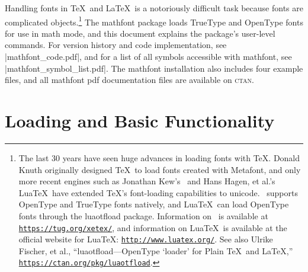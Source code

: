 \documentclass[12pt,twoside]{article}
\def\link#1{\href{#1}{\nolinkurl{#1}}}
\begin{document}
\def\ref#1{\csname fig@#1\endcsname}

\def\documentname{User Guide}
\def\showabstract{1}


Handling fonts in \TeX\ and \LaTeX\ is a notoriously difficult task because fonts are complicated objects.\footnote{The last 30 years have seen huge advances in loading fonts with \TeX. Donald Knuth originally designed \TeX\ to load fonts created with Metafont, and only more recent engines such as Jonathan Kew's \XeTeX\ and Hans Hagen, et al.'s Lua\TeX\ have extended \TeX's font-loading capabilities to unicode. \XeTeX\ supports OpenType and TrueType fonts natively, and Lua\TeX\ can load OpenType fonts through the \textsf{luaotfload} package. Information on \XeTeX\ is available at \link{https://tug.org/xetex/}, and information on Lua\TeX\ is available at the official website for Lua\TeX: \link{http://www.luatex.org/}. See also Ulrike Fischer, et al., ``\textsf{luaotfload}---OpenType `loader' for Plain \TeX\ and \LaTeX,'' \link{https://ctan.org/pkg/luaotfload}.} The \textsf{mathfont} package loads TrueType and OpenType fonts for use in math mode, and this document explains the package's user-level commands. For version history and code implementation, see |mathfont_code.pdf|, and for a list of all symbols accessible with \textsf{mathfont}, see |mathfont_symbol_list.pdf|. The \textsf{mathfont} installation also includes four example files, and all \textsf{mathfont} pdf documentation files are available on \textsc{ctan}.

\section{Loading and Basic Functionality}
\end{document}
